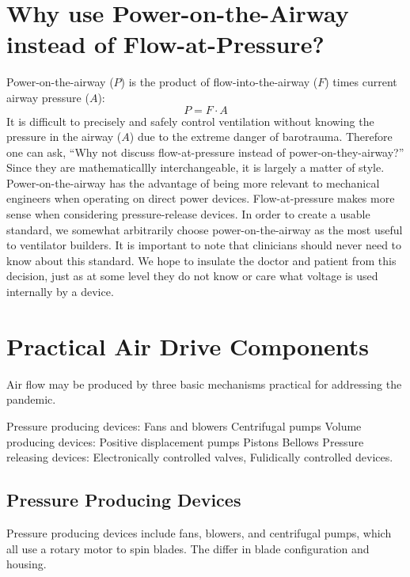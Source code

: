 \documentclass{article}
\begin{document}
\section{Why use Power-on-the-Airway instead of Flow-at-Pressure?}

Power-on-the-airway ($P$) is the product of flow-into-the-airway ($F$) times
current airway pressure ($A$):
\begin{equation}
  P = F \cdot A
\end{equation}
It is difficult to precisely and safely control ventilation without knowing the
pressure in the airway ($A$) due to the extreme danger of barotrauma.
Therefore one can ask,
``Why not discuss flow-at-pressure instead
of power-on-they-airway?''
Since they are mathematicallly interchangeable, it is
largely a matter of style. Power-on-the-airway has the advantage of being
more relevant to mechanical engineers when operating on direct power devices.
Flow-at-pressure makes more sense when considering pressure-release devices.
In order to create a usable standard, we somewhat arbitrarily choose power-on-the-airway
as the most useful to ventilator builders. It is important to note that clinicians
should never need to know about this standard. We hope to insulate the doctor and
patient from this decision, just as at some level they do not know or care what voltage
is used internally by a device.

\section{Practical Air Drive Components}

Air flow may be produced by three basic mechanisms practical for addressing the pandemic.

\begin{outline}
  \1 Pressure producing devices:
  \2 Fans and blowers
  \2 Centrifugal pumps
  \1 Volume producing devices:
  \2 Positive displacement pumps
  \2 Pistons
  \2 Bellows
  \1 Pressure releasing devices:
  \2 Electronically controlled valves,
  \2 Fulidically controlled devices.
\end{outline}


\subsection{Pressure Producing Devices}

Pressure producing devices include fans, blowers, and centrifugal pumps, which
all use a rotary motor to spin blades. The differ in blade configuration and
housing.
\end{document}
